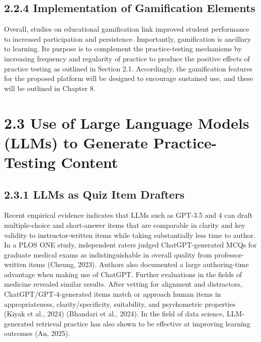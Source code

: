 \documentclass[
  12pt,
  a4paper,
]{report}
\begin{document}
\hypertarget{implementation-of-gamification-elements}{%
\subsection{2.2.4 Implementation of Gamification
Elements}\label{implementation-of-gamification-elements}}

Overall, studies on educational gamification link improved student
performance to increased participation and persistence. Importantly,
gamification is ancillary to learning. Its purpose is to complement the
practice-testing mechanisms by increasing frequency and regularity of
practice to produce the positive effects of practice testing as outlined
in Section 2.1. Accordingly, the gamification features for the proposed
platform will be designed to encourage sustained use, and these will be
outlined in Chapter 8.

\hypertarget{use-of-large-language-models-llms-to-generate-practice-testing-content}{%
\section{2.3 Use of Large Language Models (LLMs) to Generate
Practice-Testing
Content}\label{use-of-large-language-models-llms-to-generate-practice-testing-content}}

\hypertarget{llms-as-quiz-item-drafters}{%
\subsection{2.3.1 LLMs as Quiz Item
Drafters}\label{llms-as-quiz-item-drafters}}

Recent empirical evidence indicates that LLMs such as GPT-3.5 and 4 can
draft multiple-choice and short-answer items that are comparable in
clarity and key validity to instructor-written items while taking
substantially less time to author. In a PLOS ONE study, independent
raters judged ChatGPT-generated MCQs for graduate medical exams as
indistinguishable in overall quality from professor-written items
(Cheung, 2023). Authors also documented a large authoring-time advantage
when making use of ChatGPT. Further evaluations in the fields of
medicine revealed similar results. After vetting for alignment and
distractors, ChatGPT/GPT-4-generated items match or approach human items
in appropriateness, clarity/specificity, suitability, and psychometric
properties (Kiyak et al., 2024) (Bhandari et al., 2024). In the field of
data science, LLM-generated retrieval practice has also shown to be
effective at improving learning outcomes (An, 2025).
\end{document}
